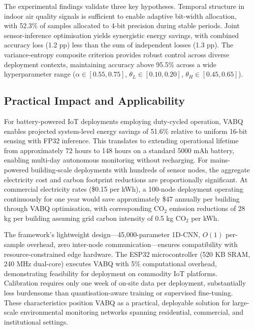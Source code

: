 The experimental findings validate three key hypotheses. Temporal structure in indoor air quality signals is sufficient to enable adaptive bit-width allocation, with 52.3\% of samples allocated to 4-bit precision during stable periods. Joint sensor-inference optimisation yields synergistic energy savings, with combined accuracy loss (1.2 pp) less than the sum of independent losses (1.3 pp). The variance-entropy composite criterion provides robust control across diverse deployment contexts, maintaining accuracy above 95.5\% across a wide hyperparameter range ($\alpha \in [0.55, 0.75]$, $\theta_L \in [0.10, 0.20]$, $\theta_H \in [0.45, 0.65]$).

\subsection{Practical Impact and Applicability}
\label{sec:conc_impact}

For battery-powered IoT deployments employing duty-cycled operation, VABQ enables projected system-level energy savings of 51.6\% relative to uniform 16-bit sensing with FP32 inference. This translates to extending operational lifetime from approximately 72 hours to 148 hours on a standard 5000 mAh battery, enabling multi-day autonomous monitoring without recharging. For mains-powered building-scale deployments with hundreds of sensor nodes, the aggregate electricity cost and carbon footprint reductions are proportionally significant. At commercial electricity rates (\$0.15 per kWh), a 100-node deployment operating continuously for one year would save approximately \$47 annually per building through VABQ optimisation, with corresponding CO$_2$ emission reductions of 28 kg per building assuming grid carbon intensity of 0.5 kg CO$_2$ per kWh.

The framework's lightweight design---45,000-parameter 1D-CNN, $O(1)$ per-sample overhead, zero inter-node communication---ensures compatibility with resource-constrained edge hardware. The ESP32 microcontroller (520 KB SRAM, 240 MHz dual-core) executes VABQ with 5\% computational overhead, demonstrating feasibility for deployment on commodity IoT platforms. Calibration requires only one week of on-site data per deployment, substantially less burdensome than quantisation-aware training or supervised fine-tuning. These characteristics position VABQ as a practical, deployable solution for large-scale environmental monitoring networks spanning residential, commercial, and institutional settings.

